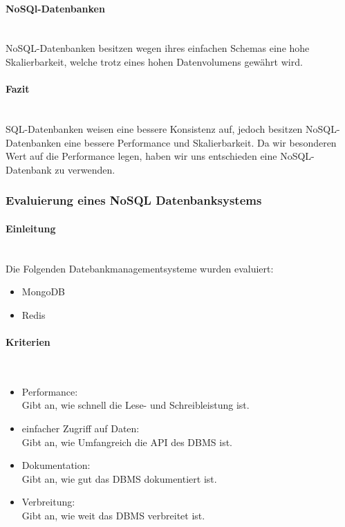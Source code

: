 \paragraph{NoSQl-Datenbanken} \mbox{}\\
NoSQL-Datenbanken besitzen wegen ihres einfachen Schemas eine hohe Skalierbarkeit, welche trotz eines
hohen Datenvolumens gew\"ahrt wird.

\paragraph{Fazit} \mbox{}\\
SQL-Datenbanken weisen eine bessere Konsistenz auf, jedoch besitzen NoSQL-Datenbanken
eine bessere Performance und Skalierbarkeit. Da wir besonderen Wert auf die Performance
legen, haben wir uns entschieden eine NoSQL-Datenbank zu verwenden.

\subsubsection{Evaluierung eines NoSQL Datenbanksystems}

\paragraph{Einleitung} \mbox{}\\
Die Folgenden Datebankmanagementsysteme wurden evaluiert:

\begin{itemize}
	\item MongoDB
	\item Redis
\end{itemize}

\paragraph{Kriterien} \mbox{}\\

\begin{itemize}
	\item Performance: \\Gibt an, wie schnell die Lese- und Schreibleistung ist.
	\item einfacher Zugriff auf Daten: \\Gibt an, wie Umfangreich die API des DBMS ist.
	\item Dokumentation:\\ Gibt an, wie gut das DBMS dokumentiert ist.
	\item Verbreitung:\\ Gibt an, wie weit das DBMS verbreitet ist.
\end{itemize}

